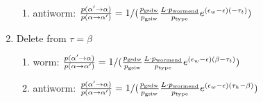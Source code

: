 \documentclass[12pt, two sided]{article}
\begin{document}
\begin{enumerate}
\begin{enumerate}
		\item{antiworm: $\frac{p(\alpha^\prime\to\alpha)}{p(\alpha\to\alpha^\prime)}=1/(\frac{p_{\rm{gsdw}}}{p_{\rm{gsiw}}} \frac{L \cdot p_{\rm{wormend}}}{p_{\rm{type}}} e^{(\epsilon_w-\epsilon)(-\tau_t)})$}
		\end{enumerate}
		\item Delete from $\tau=\beta$ 
		\begin{enumerate}
		\item{worm: $\frac{p(\alpha^\prime\to\alpha)}{p(\alpha\to\alpha^\prime)} = 1/(\frac{p_{\rm{gsdw}}}{p_{\rm{gsiw}}} \frac{L \cdot p_{\rm{wormend}}}{p_{\rm{type}}} e^{(\epsilon_w-\epsilon)(\beta-\tau_t)})$}
		\item{antiworm: $\frac{p(\alpha^\prime\to\alpha)}{p(\alpha\to\alpha^\prime)} = 1/(\frac{p_{\rm{gsdw}}}{p_{\rm{gsiw}}} \frac{L \cdot p_{\rm{wormend}}}{p_{\rm{type}}} e^{(\epsilon_w-\epsilon)(\tau_h-\beta)})$}
		\end{enumerate}
	\end{enumerate}
	
\end{document}
